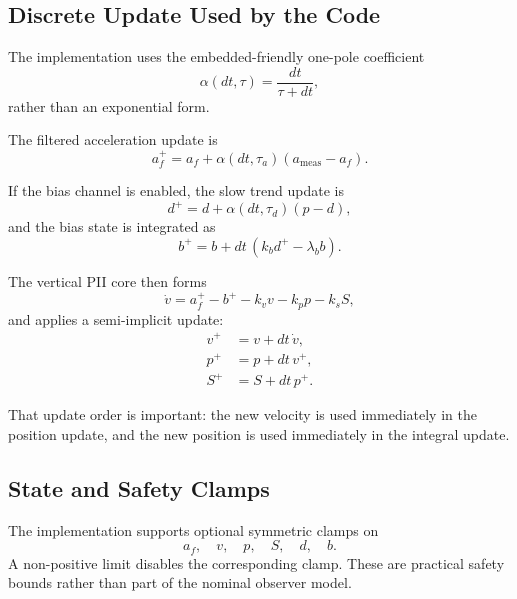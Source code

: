 \documentclass[conference]{IEEEtran}
\begin{document}
\subsection{Discrete Update Used by the Code}

The implementation uses the embedded-friendly one-pole coefficient
\begin{equation}
\alpha(dt,\tau) = \frac{dt}{\tau + dt},
\end{equation}
rather than an exponential form.

The filtered acceleration update is
\begin{equation}
a_f^{+} = a_f + \alpha(dt,\tau_a)(a_{\mathrm{meas}}-a_f).
\end{equation}

If the bias channel is enabled, the slow trend update is
\begin{equation}
d^{+} = d + \alpha(dt,\tau_d)(p-d),
\end{equation}
and the bias state is integrated as
\begin{equation}
b^{+} = b + dt\,(k_b d^{+} - \lambda_b b).
\end{equation}

The vertical PII core then forms
\begin{equation}
\dot{v} = a_f^{+} - b^{+} - k_v v - k_p p - k_s S,
\end{equation}
and applies a semi-implicit update:
\begin{align}
v^{+} &= v + dt\,\dot{v}, \\
p^{+} &= p + dt\,v^{+}, \\
S^{+} &= S + dt\,p^{+}.
\end{align}

That update order is important: the new velocity is used immediately in the
position update, and the new position is used immediately in the integral
update.

\subsection{State and Safety Clamps}

The implementation supports optional symmetric clamps on
\begin{equation}
a_f,\quad v,\quad p,\quad S,\quad d,\quad b.
\end{equation}
A non-positive limit disables the corresponding clamp. These are practical
safety bounds rather than part of the nominal observer model.
\end{document}

